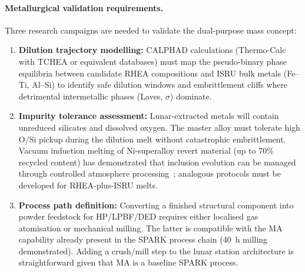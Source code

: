 \documentclass[11pt,a4paper]{article}
\begin{document}
\paragraph{Metallurgical validation requirements.}
Three research campaigns are needed to validate the dual-purpose mass concept:
%
\begin{enumerate}[leftmargin=1.4em]
    \item \textbf{Dilution trajectory modelling:} CALPHAD calculations (Thermo-Calc with TCHEA or equivalent databases) must map the pseudo-binary phase equilibria between candidate RHEA compositions and ISRU bulk metals (Fe--Ti, Al--Si) to identify safe dilution windows and embrittlement cliffs where detrimental intermetallic phases (Laves, $\sigma$) dominate.

    \item \textbf{Impurity tolerance assessment:} Lunar-extracted metals will contain unreduced silicates and dissolved oxygen. The master alloy must tolerate high O/Si pickup during the dilution melt without catastrophic embrittlement. Vacuum induction melting of Ni-superalloy revert material (up to 70\% recycled content) has demonstrated that inclusion evolution can be managed through controlled atmosphere processing~\cite{Li2024revert}; analogous protocols must be developed for RHEA-plus-ISRU melts.

    \item \textbf{Process path definition:} Converting a finished structural component into powder feedstock for HP/LPBF/DED requires either localised gas atomisation or mechanical milling. The latter is compatible with the MA capability already present in the SPARK process chain (40~h milling demonstrated). Adding a crush/mill step to the lunar station architecture is straightforward given that MA is a baseline SPARK process.
\end{enumerate}
\end{document}
